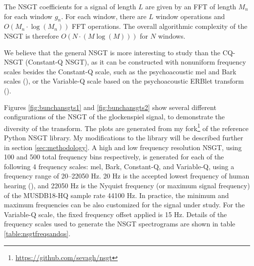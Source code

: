 \documentclass[report.tex]{subfiles}
\begin{document}
The NSGT coefficients for a signal of length $L$ are given by an FFT of length $M_{n}$ for each window $g_{n}$. For each window, there are $L$ window operations and $O(M_{n} \cdot \log(M_{n}))$ FFT operations. The overall algorithmic complexity of the NSGT is therefore $O(N \cdot (M \log(M)))$ for $N$ windows.

We believe that the general NSGT is more interesting to study than the CQ-NSGT (Constant-Q NSGT), as it can be constructed with nonuniform frequency scales besides the Constant-Q scale, such as the psychoacoustic mel and Bark scales (\cite[Chapter~4]{melbook}), or the Variable-Q scale based on the psychoacoustic ERBlet transform (\cite{variableq1, variableq2}).

Figures \ref{fig:bunchansgts1} and \ref{fig:bunchansgts2} show several different configurations of the NSGT of the glockenspiel signal, to demonstrate the diversity of the transform. The plots are generated from my fork\footnote{\url{https://github.com/sevagh/nsgt}} of the reference Python NSGT library. My modifications to the library will be described further in section \ref{sec:methodology}. A high and low frequency resolution NSGT, using 100 and 500 total frequency bins respectively, is generated for each of the following 4 frequency scales: mel, Bark, Constant-Q, and Variable-Q, using a frequency range of 20--22050 Hz. 20 Hz is the accepted lowest frequency of human hearing (\cite{moore}), and 22050 Hz is the Nyquist frequency (or maximum signal frequency) of the MUSDB18-HQ sample rate 44100 Hz. In practice, the minimum and maximum frequencies can be also customized for the signal under study. For the Variable-Q scale, the fixed frequency offset applied is 15 Hz.  Details of the frequency scales used to generate the NSGT spectrograms are shown in table \ref{table:nsgtfreqsandqs}.
\end{document}
